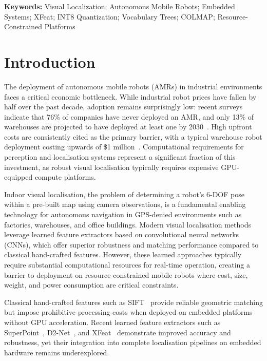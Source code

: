 \documentclass[12pt]{article}
\begin{document}
\textbf{Keywords:} Visual Localization; Autonomous Mobile Robots; Embedded Systems; XFeat; INT8 Quantization; Vocabulary Trees; COLMAP; Resource-Constrained Platforms

\section{Introduction}

The deployment of autonomous mobile robots (AMRs) in industrial environments faces a critical economic bottleneck. While industrial robot prices have fallen by half over the past decade, adoption remains surprisingly low: recent surveys indicate that 76\% of companies have never deployed an AMR, and only 13\% of warehouses are projected to have deployed at least one by 2030~\cite{WarehouseAutomationStatistics2023,therobotreportInteractAnalysisDowngrades2024}. High upfront costs are consistently cited as the primary barrier, with a typical warehouse robot deployment costing upwards of \$1 million~\cite{alexisWarehouseRobotMomentum2024}. Computational requirements for perception and localisation systems represent a significant fraction of this investment, as robust visual localisation typically requires expensive GPU-equipped compute platforms.

Indoor visual localisation, the problem of determining a robot's 6-DOF pose within a pre-built map using camera observations, is a fundamental enabling technology for autonomous navigation in GPS-denied environments such as factories, warehouses, and office buildings. Modern visual localisation methods leverage learned feature extractors based on convolutional neural networks (CNNs), which offer superior robustness and matching performance compared to classical hand-crafted features. However, these learned approaches typically require substantial computational resources for real-time operation, creating a barrier to deployment on resource-constrained mobile robots where cost, size, weight, and power consumption are critical constraints.

Classical hand-crafted features such as SIFT~\cite{loweDistinctiveImageFeatures2004} provide reliable geometric matching but impose prohibitive processing costs when deployed on embedded platforms without GPU acceleration. Recent learned feature extractors such as SuperPoint~\cite{detoneSuperPointSelfSupervisedInterest2018}, D2-Net~\cite{dusmanuD2NetTrainableCNN2019}, and XFeat~\cite{potjeXFeatAcceleratedFeatures2024} demonstrate improved accuracy and robustness, yet their integration into complete localisation pipelines on embedded hardware remains underexplored. 
\end{document}
